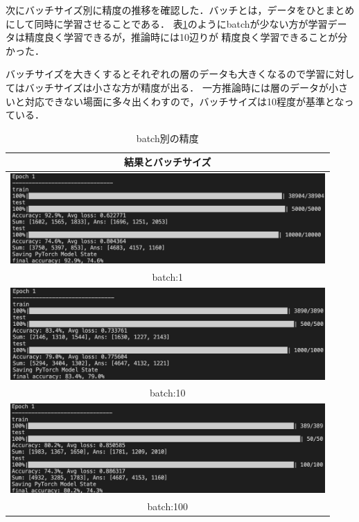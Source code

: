 次にバッチサイズ別に精度の推移を確認した．バッチとは，データをひとまとめにして同時に学習させることである．
表\ref{batch}のようにbatchが少ない方が学習データは精度良く学習できるが，推論時には10辺りが
精度良く学習できることが分かった．

バッチサイズを大きくするとそれぞれの層のデータも大きくなるので学習に対してはバッチサイズは小さな方が精度が出る．
一方推論時には層のデータが小さいと対応できない場面に多々出くわすので，バッチサイズは10程度が基準となっている．

\begin{table}[b]
  \begin{center}
    \begin{tabular}{|c|} \hline
      結果とバッチサイズ \\ \hline
      \includegraphics[width=120mm]{images/net_result/batch1.png}
      \\ batch:1 \\ \hline
      \includegraphics[width=120mm]{images/net_result/batch10.png}
      \\ batch:10 \\ \hline
      \includegraphics[width=120mm]{images/net_result/batch100.png}
      \\ batch:100 \\ \hline
    \end{tabular}
  \end{center}
  \caption{batch別の精度}
  \label{batch}
\end{table}
\clearpage

